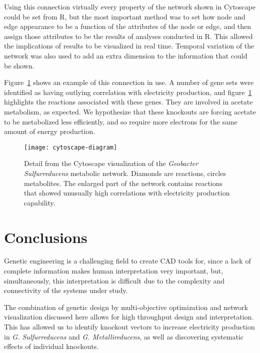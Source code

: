 \documentclass[a4paper,twocolumn]{article}
\begin{document}
Using this connection virtually every property of the network shown in Cytoscape could be set from R, but the most important method was to set how node and edge appearance to be a function of the attributes of the node or edge, and then assign those attributes to be the results of analyses conducted in R. This allowed the implications of results to be visualized in real time. Temporal variation of the network was also used to add an extra dimension to the information that could be shown.

Figure~\ref{fig:cytoscape-screenshot} shows an example of this connection in use. A number of gene sets were identified as having outlying correlation with electricity production, and figure~\ref{fig:cytoscape-screenshot} highlights the reactions associated with these genes. They are involved in acetate metabolism, as expected. We hypothesize that these knockouts are forcing acetate to be metabolized less efficiently, and so require more electrons for the same amount of energy production.

\begin{figure}[!htb]
\texttt{[image: cytoscape-diagram]}
\caption{Detail from the Cytoscape visualization of the {\it Geobacter Sulfurreducens} metabolic network. Diamonds are reactions, circles metabolites. The enlarged part of the network contains reactions that showed unusually high correlations with electricity production capability.}
\label{fig:cytoscape-screenshot}
\end{figure}

\section{Conclusions}

Genetic engineering is a challenging field to create CAD tools for, since a lack of complete information makes human interpretation very important, but, simultaneously, this interpretation is difficult due to the complexity and connectivity of the systems under study. 


The combination of genetic design by multi-objective optimization and network visualization discussed here allows for high throughput design and interpretation. This has allowed us to identify knockout vectors to increase electricity production in {\it G. Sulfurreducens} and {\it G. Metallireducens}, as well as discovering systematic effects of individual knockouts.
\end{document}
